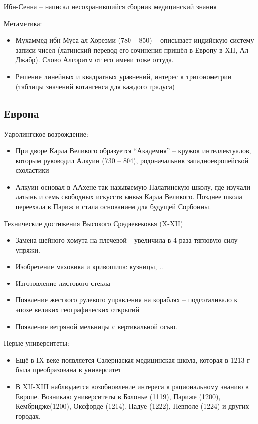 \documentclass{book}
\theoremstyle{definition}
\begin{document}
    Ибн-Сенна -- написал несохранившийся сборник медицинский знания

    Метаметика:
    \begin{itemize}
        \item  Мухаммед ибн Муса ал-Хорезми (780 -- 850) -- описывает индийскую систему записи чисел (латинский перевод его сочинения пришёл в Европу в XII, Ал-Джабр). Слово Алгоритм от его имени тоже оттуда.
        \item Решение линейных и квадратных уравнений, интерес к тригонометрии (таблицы значений котангенса для каждого градуса)
    \end{itemize}


    \subsection{Европа}

    Уаролингское возрождение:
    \begin{itemize}
        \item При дворе Карла Великого образуется ``Академия'' -- кружок интеллектуалов, которым руководил Алкуин (730 -- 804), родоначальник западноевропейской схоластики
        \item Алкуин основал в ААхене так называемую Палатинскую школу, где изучали латынь и семь свободных искусств ынвья Карла Великого. Позднее школа переехала в Париж и стала основанием для будущей Сорбонны.
    \end{itemize}

    Технические достижения Высокого Средневековья (X-XII)
    \begin{itemize}
        \item Замена шейного хомута на плечевой -- увеличила в 4 раза тягловую силу упряжи.
        \item Изобретение маховика и кривошипа: кузницы, ..
        \item Изготовление листового стекла
        \item Появление жесткого рулевого управления на кораблях -- подготаливало к эпохе великих географических открытий
        \item Появление ветряной мельницы с вертикальной осью.
    \end{itemize}

    Перые университеты:
    \begin{itemize}
        \item Ещё в IX веке появляется Салернаская медицинская школа, которая в 1213 г была преобразована в университет
        \item В XII-XIII наблюдается возобновление интереса к рациональному знанию в Европе. Возникаю университеты в Болонье (1119), Париже (1200), Кембридже(1200), Оксфорде (1214), Падуе (1222), Невполе (1224) и других городах.
    \end{itemize}
\end{document}
